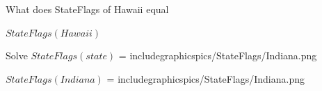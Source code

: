 \documentclass{ximera}
\begin{document}
\begin{question}

What does StateFlags of Hawaii equal

\begin{multipleChoice}
\end{multipleChoice}
\begin{feedback}
$StateFlags(Hawaii)$ 
\end{feedback}
\end{question}





\begin{question}

Solve $StateFlags(state)$ = includegraphics{pics/StateFlags/Indiana.png}

\begin{multipleChoice}
\end{multipleChoice}
\begin{feedback}
$StateFlags(Indiana)$ = includegraphics{pics/StateFlags/Indiana.png}
\end{feedback}
\end{question}
\end{document}
